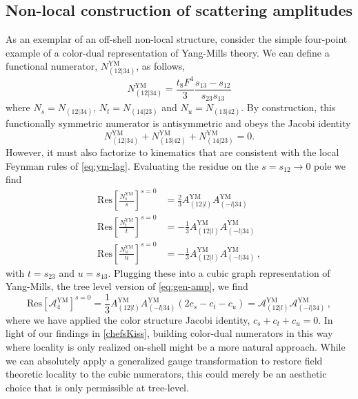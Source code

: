 \documentclass[11pt,letter]{article}
\begin{document}
\subsection{Non-local construction of scattering amplitudes}
\label{nonLocalScattering}
As an exemplar of an off-shell non-local structure, consider the simple four-point example of a color-dual
representation of Yang-Mills theory. We can define a functional numerator, $N_{(12|34)}^{\text{YM}}$, as follows, 
\begin{equation}
N_{(12|34)}^{\text{YM}} = \frac{t_8F^4}{3} \frac{s_{13}-s_{12}}{s_{23}{s_{13}}}
\end{equation}
where $N_s = N_{(12|34)}$, $N_t = N_{(14|23)}$ and $N_u = N_{(13|42)}$. By construction, this functionally symmetric numerator is
antisymmetric and obeys the Jacobi identity
\begin{equation}\label{nonLocalNum}
N_{(12|34)}^{\text{YM}} + N_{(13|42)}^{\text{YM}} +N_{(14|23)}^{\text{YM}} = 0.
\end{equation}
However, it must also factorize to kinematics that are consistent with
the local Feynman rules of \cref{eq:ym-lag}. Evaluating the residue on
the $s=s_{12} \to 0$ pole we find
\begin{align}
\text{Res}\left[\frac{ N_{s}^{\text{YM}} }{s}\right]^{s=0}&= \frac{2}{3}A_{(12|l)}^{\text{YM}}A_{(-l|34)}^{\text{YM}} 
\\
\text{Res}\left[\frac{N_{t}^{\text{YM}} }{t}\right]^{s=0}&= -\frac{1}{3}A_{(12|l)}^{\text{YM}}A_{(-l|34)}^{\text{YM}} 
\\
\text{Res}\left[\frac{N_{u}^{\text{YM}} }{u}\right]^{s=0}&= -\frac{1}{3} A_{(12|l)}^{\text{YM}}A_{(-l|34)}^{\text{YM}} \, ,
\end{align}
with $t=s_{23}$ and $u=s_{13}$.
Plugging these into a cubic graph representation of Yang-Mills, the
tree level version of \cref{eq:gen-amp}, we find
\begin{equation}
  \text{Res}\left[\mathcal{A}_4^{\text{YM}}\right]^{s=0}
  = \frac{1}{3} A_{(12|l)}^{\text{YM}}A_{(-l|34)}^{\text{YM}} (2c_s-c_t-c_u)
  =  \mathcal{A}_{(12|l)}^{\text{YM}}\mathcal{A}_{(-l|34)}^{\text{YM}} \, ,
\end{equation}
where we have applied the color structure Jacobi identity,
$c_s+c_t+c_u=0$. In light of our findings in \cref{chefsKiss}, building color-dual numerators in this way where locality is only realized on-shell might be a more natural approach. While we can absolutely apply a generalized gauge
transformation \cite{BCJ} to restore field theoretic locality to the
cubic numerators, this could merely be an aesthetic choice that is only permissible at tree-level.
\end{document}

